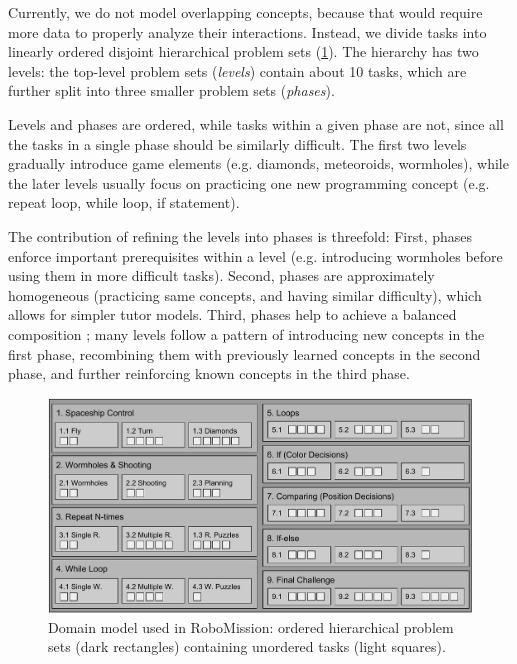 Currently, we do not model overlapping concepts, because that would require
more data to properly analyze their interactions.
Instead, we divide tasks into linearly ordered disjoint hierarchical problem
sets (\cref{fig:robomission.domain}). %
The hierarchy has two levels: the top-level problem sets (\emph{levels})  %
contain about 10 tasks, which are further split into three smaller
problem sets (\emph{phases}).

Levels and phases are ordered, while tasks within a given phase are not,
since all the tasks in a single phase should be similarly difficult.
The first two levels gradually introduce game elements
(e.g. diamonds, meteoroids, wormholes),
while the later levels usually focus on practicing one new programming
concept (e.g. repeat loop, while loop, if statement).

The contribution of refining the levels into phases is threefold:
First, phases enforce important prerequisites within a level (e.g.
introducing wormholes before using them in more difficult tasks).
Second, phases are approximately homogeneous (practicing same concepts, and having similar difficulty),
which allows for simpler tutor models.
Third, phases help to achieve a balanced composition \cite{progression-analysis};
  many levels follow a pattern of
  introducing new concepts in the first phase,
  recombining them with previously learned concepts in the second phase,
  and further reinforcing known concepts in the third phase. %

\begin{figure}[htb]
\centering
\includegraphics[width=\textwidth]{img/robomission-domain}
\caption{%
  Domain model used in RoboMission: ordered hierarchical problem sets (dark rectangles)
  containing unordered tasks (light squares).}
\label{fig:robomission.domain}
\end{figure}




